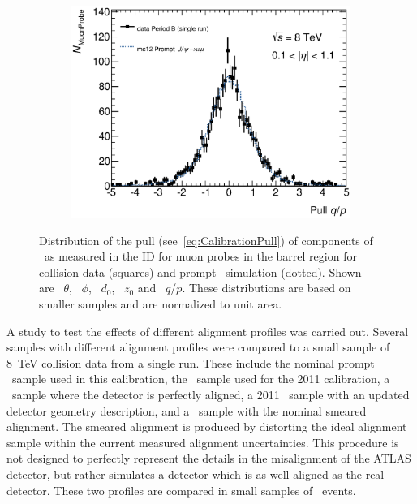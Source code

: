 \begin{figure}[htbp]
    \begin{subfigure}[b]{0.49\textwidth}
      \includegraphics[width=\textwidth]{PartCalibration2012/Plots/DiscrepancyStudy/Pull/h_pull_qoverp_Nominal.eps}
      \caption{}\label{fig:CalibrationPullPt}
    \end{subfigure}
    \caption[Distribution of the pull of components of \xsd\ as measured in the ID for muon probes in the barrel region for collision data (squares) and prompt \jpsi\ simulation (dotted).]{Distribution of the pull (see~\ref{eq:CalibrationPull}) of components of \xsd\ as measured in the ID for muon probes in the barrel region for collision data (squares) and prompt \jpsi\ simulation (dotted). Shown are~ $\theta$,~ $\phi$,~ $d_{0}$,~ $z_{0}$ and~ $q$/$p$. These distributions are based on smaller samples and are normalized to unit area.}\label{fig:CalibrationPull}
\end{figure}

A study to test the effects of different alignment profiles was carried out. Several samples with different alignment profiles were compared to a small sample of \SI{8}{\TeV} collision data from a single run. These include the nominal prompt \jpsi\ sample used in this calibration, the \jpsi\ sample used for the 2011 calibration, a \ZMu\ sample where the detector is perfectly aligned, a 2011 \ZMu\ sample with an updated detector geometry description, and a \ZMu\ sample with the nominal smeared alignment. The smeared alignment is produced by distorting the ideal alignment sample within the current measured alignment uncertainties. This procedure is not designed to perfectly represent the details in the misalignment of the ATLAS detector, but rather simulates a detector which is as well aligned as the real detector. These two profiles are compared in small samples of \ZMu\ events.

